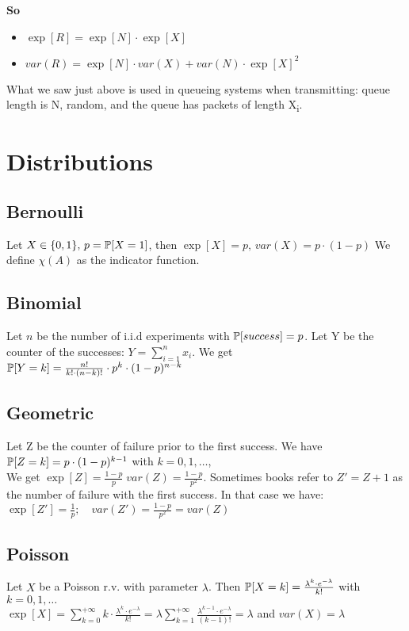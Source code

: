 \textbf{So}
\begin{itemize}
  \item $\exp[R] = \exp[N] \cdot \exp[X]$
  \item $var(R) = \exp[N] \cdot var(X) + var(N) \cdot \exp[X]^2$
\end{itemize}

What we saw just above is used in queueing systems when transmitting: queue length is N, random,
and the queue has packets of length X\textsubscript{i}.

\section{Distributions}
\subsection{Bernoulli}
Let $X \in \{0,1\}, \, p = \mathbb{P}[X=1]$, then $\exp[X]=p, \, var(X)=p \cdot (1-p)$
We define $\chi(A)$ as the indicator function.

\subsection{Binomial}
Let $n$ be the number of i.i.d experiments with $\mathbb{P}[success]=p$. Let Y be the counter of the successes:
$Y=\sum\limits_{i=1}^{n} x_i$. We get $\mathbb{P}[Y=k]= \frac{n!}{k! \cdot (n-k)!}\cdot p^k \cdot (1-p)^{n-k}$

\subsection{Geometric}
Let Z be the counter of failure prior to the first success. We have $\mathbb{P}[Z=k] = p \cdot (1-p)^{k-1}$ with $k=0,1,\dots$, \\
We get $\exp[Z]=\frac{1-p}{p} \; var(Z)=\frac{1-p}{p^2}$.
Sometimes books refer to $Z'=Z+1$ as the number of failure with the first success. In that case we have:\\
$\exp[Z']=\frac{1}{p}; \quad var(Z')=\frac{1-p}{p^2}=var(Z)$

\subsection{Poisson}
Let $X$ be a Poisson r.v. with parameter $\lambda$. Then $\mathbb{P}[X=k] =  \frac{\lambda^k \cdot e^{-\lambda}}{k!}$ with $k=0,1,\dots$
\\
$\exp[X]=\sum\limits_{k=0}^{+\infty}k \cdot \frac{\lambda^k \cdot e^{-\lambda}}{k!}= \lambda \sum\limits_{k=1}^{+\infty}\frac{\lambda^{k-1}\cdot e^{-\lambda}}{(k-1)!}=\lambda$
and $var(X)=\lambda$

